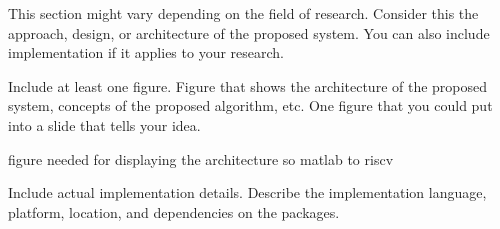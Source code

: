 This section might vary depending on the field of research. Consider this the approach, design, or architecture of the proposed system. You can also include implementation if it applies to your research.

Include at least one figure. Figure that shows the architecture of the proposed system, concepts of the proposed algorithm, etc. One figure that you could put into a slide that tells your idea. 

figure needed for displaying the architecture so matlab to riscv

Include actual implementation details. 
Describe the implementation language, platform, location, and dependencies on the packages.
